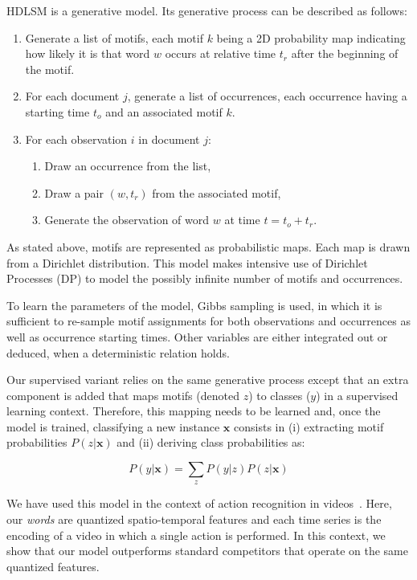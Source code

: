 HDLSM is a generative model. Its generative process can be described as
follows:
\begin{enumerate}
\item Generate a list of motifs, each motif $k$ being a 2D probability map
indicating how likely it is that word $w$ occurs at relative time $t_r$ after
the beginning of the motif.
\item For each document $j$, generate a list of occurrences, each occurrence having
a starting time $t_o$ and an associated motif $k$.
\item For each observation $i$ in document $j$:
  \begin{enumerate}
  \item Draw an occurrence from the list,
  \item Draw a pair $(w, t_r)$ from the associated motif,
  \item Generate the observation of word $w$ at time $t = t_o + t_r$.
  \end{enumerate}
\end{enumerate}

As stated above, motifs are represented as probabilistic maps.
Each map is drawn from a Dirichlet distribution.
This model makes intensive use of Dirichlet Processes (DP) to model the
possibly infinite number of motifs and occurrences.

To learn the parameters of the model, Gibbs sampling is used, in which it
is sufficient to re-sample motif assignments for both observations and
occurrences as well as occurrence starting times.
Other variables are either integrated out or deduced, when a deterministic
relation holds.

Our supervised variant relies on the same generative process except that an
extra component is added that maps motifs (denoted $z$)
to classes ($y$) in a supervised learning
context.
Therefore, this mapping needs to be learned and, once the model is trained,
classifying a new instance $\mathbf{x}$ consists in
(i) extracting motif probabilities $P(z | \mathbf{x})$ and
(ii) deriving class probabilities as:

\begin{equation}
    P(y | \mathbf{x}) = \sum_z P(y | z) P(z | \mathbf{x})
\end{equation}

We have used this model in the context of action recognition in
videos~\cite{tavenard:hal-00872048}.
Here, our \emph{words} are quantized spatio-temporal features and each time series
is the encoding of a video in which a single action is performed.
In this context, we show that our
model outperforms standard competitors that operate on the same quantized
features.

